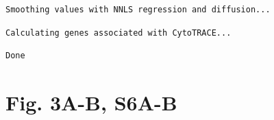 \documentclass[
  landscape]{article}
\newenvironment{Shaded}{\begin{snugshade}}{\end{snugshade}}
\newcommand{\NormalTok}[1]{#1}
\newcommand{\OtherTok}[1]{\textcolor[rgb]{0.56,0.35,0.01}{#1}}
\newcommand{\SpecialCharTok}[1]{\textcolor[rgb]{0.81,0.36,0.00}{\textbf{#1}}}
\begin{document}
\begin{verbatim}
Smoothing values with NNLS regression and diffusion...
\end{verbatim}

\begin{verbatim}
Calculating genes associated with CytoTRACE...
\end{verbatim}

\begin{verbatim}
Done
\end{verbatim}

\begin{Shaded}
\end{Shaded}

\section{Fig. 3A-B, S6A-B}\label{fig.-3a-b-s6a-b}
\end{document}
